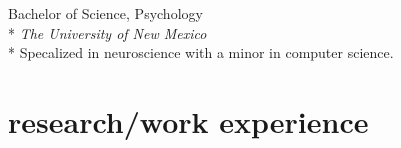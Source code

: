 \documentclass[]{friggeri-cv} %
\begin{document}
\begin{description}
  \item  {\largeheaderfont Bachelor of Science, Psychology } \hfill
    { }\\*
    {\footnotesize \emph{The University of New Mexico  }} \\*
    Specalized in neuroscience with a minor in computer science.
\end{description}

\section{research/work experience}
\end{document}
